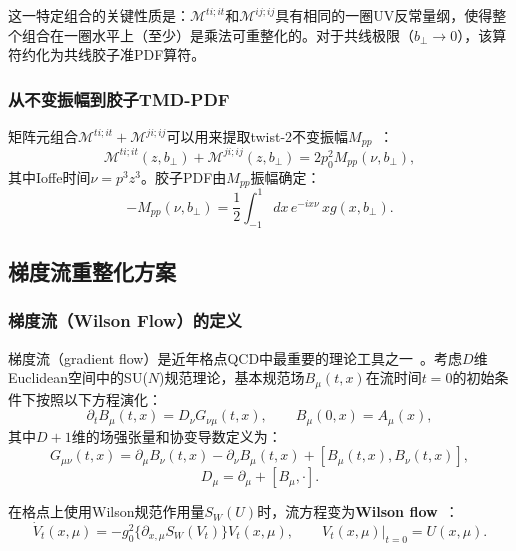 \documentclass[12pt,a4paper]{ctexart}
\theoremstyle{definition}
\newcommand{\bperp}{b_\perp}
\begin{document}
这一特定组合的关键性质是：$\mathcal{M}^{ti;it}$和$\mathcal{M}^{ij;ij}$具有相同的一圈UV反常量纲，使得整个组合在一圈水平上（至少）是乘法可重整化的。对于共线极限（$\bperp \to 0$），该算符约化为共线胶子准PDF算符。

\subsubsection{从不变振幅到胶子TMD-PDF}

矩阵元组合$\mathcal{M}^{ti;it} + \mathcal{M}^{ji;ij}$可以用来提取twist-2不变振幅$M_{pp}$~\cite{Balitsky:2019krj}：
\begin{equation}\label{eq:Mpp_extract_tmd}
    \mathcal{M}^{ti;it}(z, \bperp) + \mathcal{M}^{ji;ij}(z, \bperp) = 2p_0^2 M_{pp}(\nu, \bperp),
\end{equation}
其中Ioffe时间$\nu = p^3 z^3$。胶子PDF由$M_{pp}$振幅确定：
\begin{equation}\label{eq:Mpp_PDF_tmd}
    -M_{pp}(\nu, \bperp) = \frac{1}{2} \int_{-1}^{1} dx \, e^{-ix\nu} \, x g(x, \bperp).
\end{equation}

\subsection{梯度流重整化方案}

\subsubsection{梯度流（Wilson Flow）的定义}

梯度流（gradient flow）是近年格点QCD中最重要的理论工具之一~\cite{Luscher2010,LuscherWeisz2011}。考虑$D$维Euclidean空间中的SU($N$)规范理论，基本规范场$B_\mu(t,x)$在流时间$t=0$的初始条件下按照以下方程演化：
\begin{equation}\label{eq:flow_gauge}
    \partial_t B_\mu(t,x) = D_\nu G_{\nu\mu}(t,x), \qquad B_\mu(0,x) = A_\mu(x),
\end{equation}
其中$D+1$维的场强张量和协变导数定义为：
\begin{equation}
    G_{\mu\nu}(t,x) = \partial_\mu B_\nu(t,x) - \partial_\nu B_\mu(t,x) + [B_\mu(t,x), B_\nu(t,x)],
\end{equation}
\begin{equation}
    D_\mu = \partial_\mu + [B_\mu, \cdot].
\end{equation}

在格点上使用Wilson规范作用量$S_W(U)$时，流方程变为\textbf{Wilson flow}~\cite{Luscher2010}：
\begin{equation}\label{eq:wilson_flow}
    \dot{V}_t(x,\mu) = -g_0^2 \{\partial_{x,\mu} S_W(V_t)\} V_t(x,\mu), \qquad V_t(x,\mu)|_{t=0} = U(x,\mu).
\end{equation}
\end{document}
